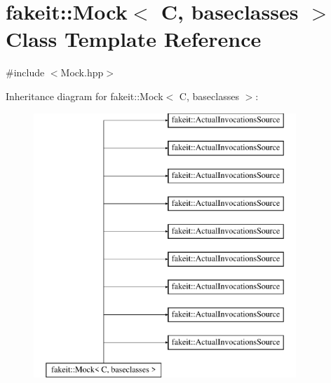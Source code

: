 \hypertarget{classfakeit_1_1Mock}{}\section{fakeit\+::Mock$<$ C, baseclasses $>$ Class Template Reference}
\label{classfakeit_1_1Mock}


{\ttfamily \#include $<$Mock.\+hpp$>$}

Inheritance diagram for fakeit\+::Mock$<$ C, baseclasses $>$\+:\begin{figure}[H]
\begin{center}
\leavevmode
\includegraphics[height=10.000000cm]{classfakeit_1_1Mock}
\end{center}
\end{figure}
